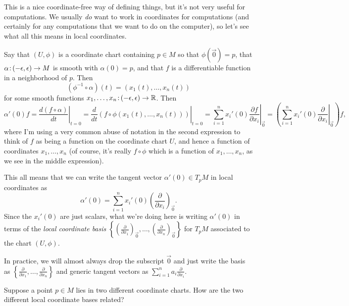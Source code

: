 This is a nice coordinate-free way of defining things, but it's not very useful for computations. We usually \emph{do} want to work in coordinates for computations (and certainly for any computations that we want to do on the computer), so let's see what all this means in local coordinates.

Say that $(U,\phi)$ is a coordinate chart containing $p \in M$ so that $\phi(\vec{0}) = p$, that $\alpha \colon\thinspace\!\! (-\epsilon , \epsilon) \to M$ is smooth with $\alpha(0) = p$, and that $f$ is a differentiable function in a neighborhood of $p$. Then
\[
	(\phi^{-1} \circ \alpha)(t) = (x_1(t), \dots , x_n(t))
\]
for some smooth functions $x_1 , \dots , x_n\colon\thinspace\!\! (-\epsilon, \epsilon) \to \mathbb{R}$. Then
\[
	\alpha'(0) f = \left. \frac{d(f \circ \alpha)}{dt} \right|_{t = 0} = \left. \frac{d}{dt} (f \circ \phi(x_1(t),\dots , x_n(t))) \right|_{t=0} = \left.\sum_{i=1}^n x_i'(0) \frac{\partial f}{\partial x_i}\right|_{\vec{0}} = \left( \left.\sum_{i=1}^n x_i'(0) \frac{\partial }{\partial x_i}\right|_{\vec{0}}\right)f,
\]
where I'm using a very common abuse of notation in the second expression to think of $f$ as being a function on the coordinate chart $U$, and hence a function of coordinates $x_1, \dots , x_n$ (of course, it's really $f \circ \phi$ which is a function of $x_1, \dots , x_n$, as we see in the middle expression).

This all means that we can write the tangent vector $\alpha'(0) \in T_pM$ in local coordinates as
\[
	\alpha'(0) = \sum_{i=1}^n x_i'(0) \left(\frac{\partial}{\partial x_i}\right)_{\vec{0}}.
\]
Since the $x_i'(0)$ are just scalars, what we're doing here is writing $\alpha'(0)$ in terms of the \emph{local coordinate basis} $\left\{\left(\frac{\partial}{\partial x_1}\right)_{\vec{0}}, \dots , \left(\frac{\partial}{\partial x_n}\right)_{\vec{0}}\right\}$ for $T_pM$ associated to the chart $(U,\phi)$.

\begin{remark}
	In practice, we will almost always drop the subscript $\vec{0}$ and just write the basis as $\left\{\frac{\partial}{\partial x_1}, \dots , \frac{\partial}{\partial x_n}\right\}$ and generic tangent vectors as $\sum_{i=1}^n a_i \frac{\partial}{\partial x_i}$.
\end{remark}

\begin{exercise}
	Suppose a point $p \in M$ lies in two different coordinate charts. How are the two different local coordinate bases related?
\end{exercise}

